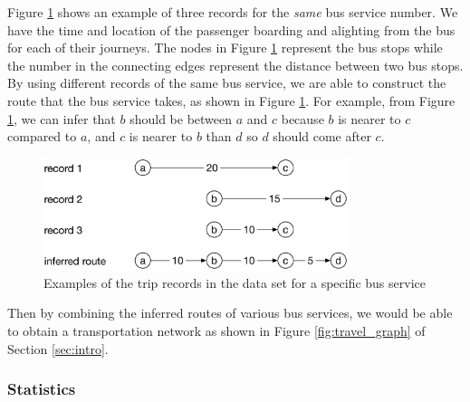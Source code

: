 \documentclass[conference]{IEEEtran.1.8}
\begin{document}
Figure \ref{fig:trip_example} shows an example of three records for the \emph{same} bus service number. We have the time and location of the passenger boarding and alighting from the bus for each of their journeys. The nodes in Figure \ref{fig:trip_example} represent the bus stops while the number in the connecting edges represent the distance between two bus stops. By using different records of the same bus service, we are able to construct the route that the bus service takes, as shown in Figure \ref{fig:trip_example}. For example, from Figure \ref{fig:trip_example}, we can infer that $b$ should be between $a$ and $c$ because $b$ is nearer to $c$ compared to $a$, and $c$ is nearer to $b$ than $d$ so $d$ should come after $c$.
\begin{figure}[htb]
	\centering
	\includegraphics[width=3.5in]{trip_example}
	\caption{Examples of the trip records in the data set for a specific bus service}
	\label{fig:trip_example}
\end{figure}
Then by combining the inferred routes of various bus services, we would be able to obtain a transportation network as shown in Figure \ref{fig:travel_graph} of Section \ref{sec:intro}.


\subsubsection{Statistics}
\end{document}
